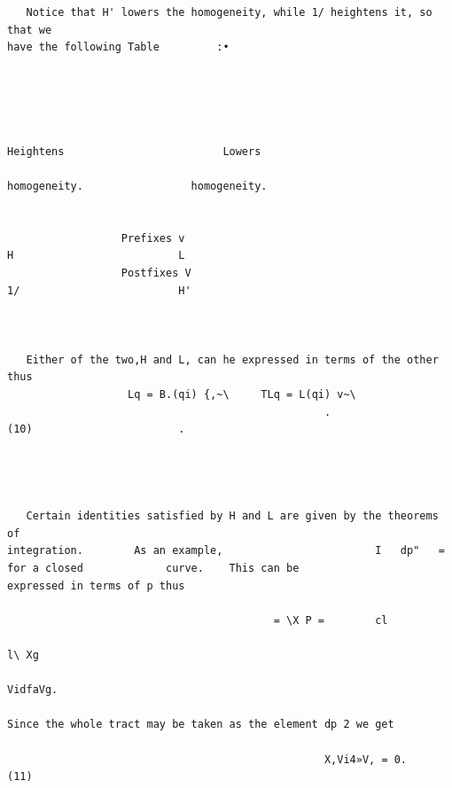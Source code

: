 \documentclass[10pt]{article}
\begin{document}
\begin{verbatim}
   Notice that H' lowers the homogeneity, while 1/ heightens it, so that we
have the following Table         :•




                                                                     Heightens                         Lowers
                                                                    homogeneity.                 homogeneity.


                  Prefixes v                                                  H                          L
                  Postfixes V                                                 1/                         H'



   Either of the two,H and L, can he expressed in terms of the other thus
                   Lq = B.(qi) {,~\     TLq = L(qi) v~\
                                                  .                     (10)                       .




   Certain identities satisfied by H and L are given by the theorems of
integration.        As an example,                        I   dp"   =          for a closed             curve.    This can be
expressed in terms of p thus

                                          = \X P =        cl
                                                                          l\ Xg
                                                                                   VidfaVg.

Since the whole tract may be taken as the element dp 2 we get

                                                  X,Vi4»V, = 0.                                                           (11)


\end{verbatim}
\clearpage
\end{document}

